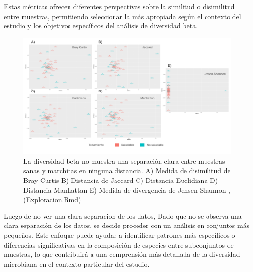 Estas métricas ofrecen diferentes perspectivas sobre la similitud o disimilitud entre muestras, permitiendo seleccionar la más apropiada según el contexto del estudio y los objetivos específicos del análisis de diversidad beta.\\

\begin{figure}[!]
\centering
\includegraphics[width=\textwidth]{Img/cap2/BetaDiversity.png}
\caption{La diversidad beta no muestra una separación clara entre muestras sanas y marchitas en ninguna distancia. A) Medida de disimilitud de Bray-Curtis B) Distancia de Jaccard C) Distancia Euclidiana D) Distancia Manhattan E) Medida de divergencia de Jensen-Shannon
,  \href{https://github.com/CamilaSilva1995/Tesis_Maestria/blob/main/Analisis_Comparativo/Fresa_Solena/01_Exploracion.Rmd}{(Exploracion.Rmd)}}
\end{figure}

Luego de no ver una clara separacion de los datos, Dado que no se observa una clara separación de los datos, se decide proceder con un análisis en conjuntos más pequeños. Este enfoque puede ayudar a identificar patrones más específicos o diferencias significativas en la composición de especies entre subconjuntos de muestras, lo que contribuirá a una comprensión más detallada de la diversidad microbiana en el contexto particular del estudio.\\

